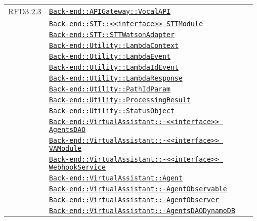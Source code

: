 \begin{longtable}{|>{\centering}m{3cm}|m{10cm}<{\centering}|}
RFD3.2.3 & \hyperref[Back-end::APIGateway::VocalAPI]{\texttt{Back-end::APIGateway::VocalAPI}}\\
& \hyperref[Back-end::STT::<<interface>> STTModule]{\texttt{Back-end::STT::<<interface>> STTModule}}\\
& \hyperref[Back-end::STT::STTWatsonAdapter]{\texttt{Back-end::STT::STTWatsonAdapter}}\\
& \hyperref[Back-end::Utility::LambdaContext]{\texttt{Back-end::Utility::LambdaContext}}\\
& \hyperref[Back-end::Utility::LambdaEvent]{\texttt{Back-end::Utility::LambdaEvent}}\\
& \hyperref[Back-end::Utility::LambdaIdEvent]{\texttt{Back-end::Utility::LambdaIdEvent}}\\
& \hyperref[Back-end::Utility::LambdaResponse]{\texttt{Back-end::Utility::LambdaResponse}}\\
& \hyperref[Back-end::Utility::PathIdParam]{\texttt{Back-end::Utility::PathIdParam}}\\
& \hyperref[Back-end::Utility::ProcessingResult]{\texttt{Back-end::Utility::ProcessingResult}}\\
& \hyperref[Back-end::Utility::StatusObject]{\texttt{Back-end::Utility::StatusObject}}\\
& \hyperref[Back-end::VirtualAssistant::<<interface>> AgentsDAO]{\texttt{Back-end::VirtualAssistant::-\linebreak <<interface>> AgentsDAO}}\\
& \hyperref[Back-end::VirtualAssistant::<<interface>> VAModule]{\texttt{Back-end::VirtualAssistant::-\linebreak <<interface>> VAModule}}\\
& \hyperref[Back-end::VirtualAssistant::<<interface>> WebhookService]{\texttt{Back-end::VirtualAssistant::-\linebreak <<interface>> WebhookService}}\\
& \hyperref[Back-end::VirtualAssistant::Agent]{\texttt{Back-end::VirtualAssistant::Agent}}\\
& \hyperref[Back-end::VirtualAssistant::AgentObservable]{\texttt{Back-end::VirtualAssistant::-\linebreak AgentObservable}}\\
& \hyperref[Back-end::VirtualAssistant::AgentObserver]{\texttt{Back-end::VirtualAssistant::-\linebreak AgentObserver}}\\
& \hyperref[Back-end::VirtualAssistant::AgentsDAODynamoDB]{\texttt{Back-end::VirtualAssistant::-\linebreak AgentsDAODynamoDB}}\\

\end{longtable}
